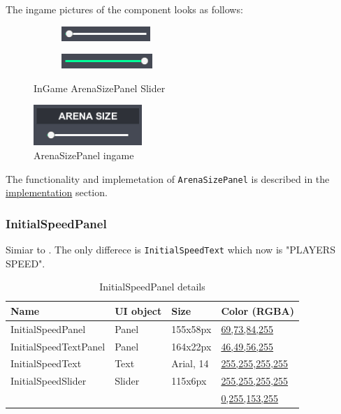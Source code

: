 \noindent The ingame pictures of the component looks as follows:

\begin{figure}[h] 
	\centering
	\begin{subfigure}{0.2\textwidth}\centering
		\includegraphics[scale=1, frame]{gui-imgs/slider0}
	\end{subfigure}
	\begin{subfigure}{0.2\textwidth}\centering
		\includegraphics[scale=1, frame]{gui-imgs/slider1}
	\end{subfigure}
	\caption{InGame ArenaSizePanel Slider}
\end{figure}

\begin{figure}[h!] 
	\centering
	\includegraphics[scale=1, frame]{gui-imgs/arenasizepanel}
	\caption{ArenaSizePanel ingame}
\end{figure}

\noindent The functionality and implemetation of \verb|ArenaSizePanel| is described in the \hyperref[gui-implementation]{implementation} section.

\subsubsection{InitialSpeedPanel}\label{gui-initialspeedpanel}
\noindent Simiar to . The only differece is \verb|InitialSpeedText| which now is "PLAYERS SPEED".

\begin{table}[h!]\centering
	\caption{InitialSpeedPanel details}
	\begin{tabular}{|C{4cm}|C{4cm}|C{4cm}|C{4cm}|}
		\hline
		\textbf{Name} & \textbf{UI object} & \textbf{Size} & \textbf{Color (RGBA)} \\\hline
		InitialSpeedPanel & Panel & 155x58px & \hyperref[gui-colors]{69,73,84,255} \\\hline
		InitialSpeedTextPanel & Panel & 164x22px & \hyperref[gui-colors]{46,49,56,255} \\\hline
		InitialSpeedText & Text & Arial, 14 & \hyperref[gui-colors]{255,255,255,255} \\\hline
		InitialSpeedSlider & Slider & 115x6px & \hyperref[gui-colors]{255,255,255,255} \\
		& & & \hyperref[gui-colors]{0,255,153,255} \\\hline
	\end{tabular}
\end{table}

